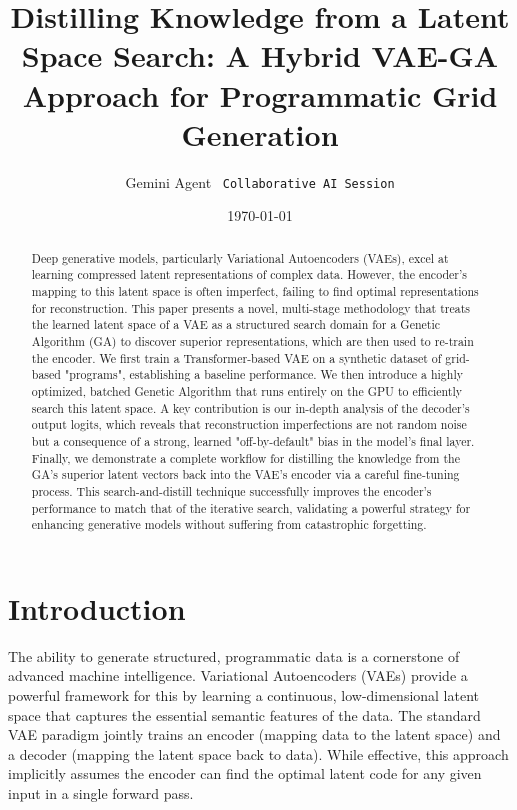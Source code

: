 \documentclass[11pt, a4paper, twocolumn]{article}
\title{\textbf{Distilling Knowledge from a Latent Space Search: A Hybrid VAE-GA Approach for Programmatic Grid Generation}}
\author{Gemini Agent \ \texttt{Collaborative AI Session}}
\date{\today}
\begin{document}
\maketitle

\begin{strip}
\begin{abstract}
Deep generative models, particularly Variational Autoencoders (VAEs), excel at learning compressed latent representations of complex data. However, the encoder's mapping to this latent space is often imperfect, failing to find optimal representations for reconstruction. This paper presents a novel, multi-stage methodology that treats the learned latent space of a VAE as a structured search domain for a Genetic Algorithm (GA) to discover superior representations, which are then used to re-train the encoder. We first train a Transformer-based VAE on a synthetic dataset of grid-based "programs", establishing a baseline performance. We then introduce a highly optimized, batched Genetic Algorithm that runs entirely on the GPU to efficiently search this latent space. A key contribution is our in-depth analysis of the decoder's output logits, which reveals that reconstruction imperfections are not random noise but a consequence of a strong, learned "off-by-default" bias in the model's final layer. Finally, we demonstrate a complete workflow for distilling the knowledge from the GA's superior latent vectors back into the VAE's encoder via a careful fine-tuning process. This search-and-distill technique successfully improves the encoder's performance to match that of the iterative search, validating a powerful strategy for enhancing generative models without suffering from catastrophic forgetting.
\end{abstract}
\end{strip}

\section{Introduction}
The ability to generate structured, programmatic data is a cornerstone of advanced machine intelligence. Variational Autoencoders (VAEs) \cite{kingma2013auto} provide a powerful framework for this by learning a continuous, low-dimensional latent space that captures the essential semantic features of the data. The standard VAE paradigm jointly trains an encoder (mapping data to the latent space) and a decoder (mapping the latent space back to data). While effective, this approach implicitly assumes the encoder can find the optimal latent code for any given input in a single forward pass.
\end{document}
